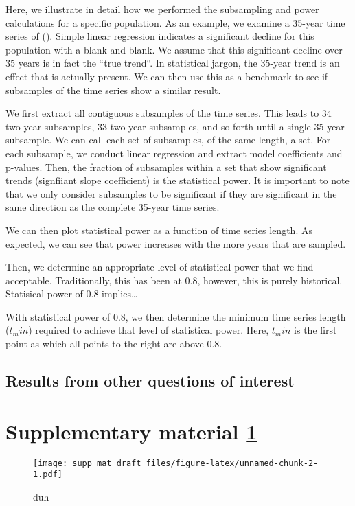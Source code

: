 \documentclass[11pt,]{article}
\begin{document}
Here, we illustrate in detail how we performed the subsampling and power
calculations for a specific population. As an example, we examine a
35-year time series of (). Simple linear regression indicates a
significant decline for this population with a blank and blank. We
assume that this significant decline over 35 years is in fact the ``true
trend``. In statistical jargon, the 35-year trend is an effect that is
actually present. We can then use this as a benchmark to see if
subsamples of the time series show a similar result.

We first extract all contiguous subsamples of the time series. This
leads to 34 two-year subsamples, 33 two-year subsamples, and so forth
until a single 35-year subsample. We can call each set of subsamples, of
the same length, a set. For each subsample, we conduct linear regression
and extract model coefficients and p-values. Then, the fraction of
subsamples within a set that show significant trends (signfiiant slope
coefficient) is the statistical power. It is important to note that we
only consider subsamples to be significant if they are significant in
the same direction as the complete 35-year time series.

We can then plot statistical power as a function of time series length.
As expected, we can see that power increases with the more years that
are sampled.

Then, we determine an appropriate level of statistical power that we
find acceptable. Traditionally, this has been at 0.8, however, this is
purely historical. Statisical power of 0.8 implies\ldots{}

With statistical power of 0.8, we then determine the minimum time series
length (\(t_min\)) required to achieve that level of statistical power.
Here, \(t_min\) is the first point as which all points to the right are
above 0.8.

\subsection{Results from other questions of
interest}\label{results-from-other-questions-of-interest}

\section{\texorpdfstring{Supplementary material
\ref{fig:growth_rate}}{Supplementary material }}\label{supplementary-material}

\begin{figure}[htbp]
\centering
\texttt{[image: supp\_mat\_draft\_files/figure-latex/unnamed-chunk-2-1.pdf]}
\caption{duh\label{fig:growth_rate}}
\end{figure}


\end{document}
